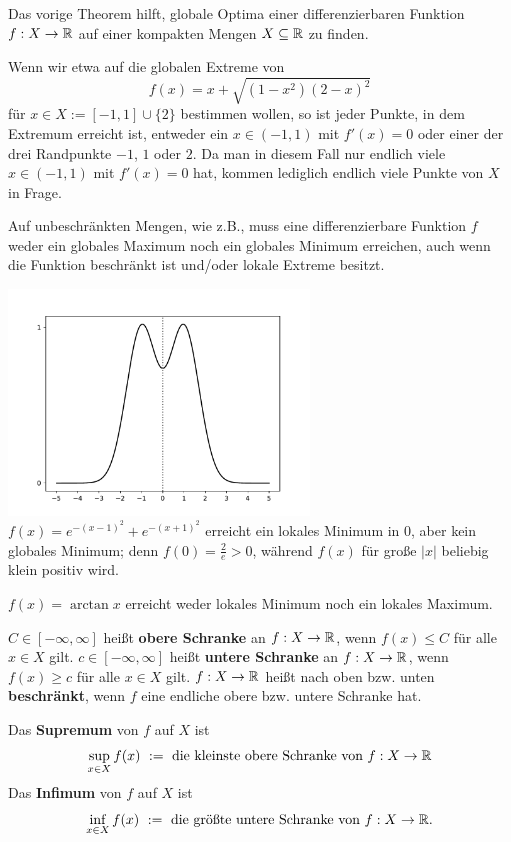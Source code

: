 \begin{bsp}
	Das vorige Theorem hilft, globale Optima einer differenzierbaren Funktion $ f: X \to \mathbb{R}$ auf einer kompakten Mengen $X \subseteq \mathbb{R}$ zu finden. 
	
	Wenn wir etwa auf die globalen Extreme von 
	\[
		f(x) = x +  \sqrt{(1-x^2) (2-x)^2 }  
	\]
	für $x \in X:= [-1,1] \cup \{2\}$ bestimmen wollen, so ist jeder Punkte, in dem Extremum erreicht ist, entweder ein $x \in (-1,1)$ mit $f'(x) = 0$ oder einer der drei Randpunkte $-1$, $1$ oder $2$. Da man in diesem Fall nur endlich viele $x \in (-1,1)$ mit $f'(x) = 0$ hat, kommen lediglich endlich viele Punkte von $X$ in Frage. 
\end{bsp} 

\begin{bsp} 
		Auf unbeschränkten Mengen, wie z.B., muss eine differenzierbare Funktion $f$  weder ein globales Maximum noch ein globales Minimum erreichen, auch wenn die Funktion beschränkt ist und/oder lokale Extreme besitzt. 
		\begin{center}
			\includegraphics[width=0.6\textwidth]{pics/camel.pdf}
			\\  $f(x) = e^{-(x-1)^2} + e^{-(x+1)^2}$ erreicht ein lokales Minimum in $0$, aber kein globales Minimum; denn $f(0) = \frac{2}{e} >0$, während $f(x)$ für große $|x|$ beliebig klein positiv wird. 
		\end{center}
	
\end{bsp} 

\begin{bsp} 
	$f(x) = \arctan x$ erreicht weder lokales Minimum noch ein lokales Maximum. 
\end{bsp} 

\begin{defn}
	$C \in [-\infty,\infty]$ heißt \textbf{obere Schranke} an $f : X \to \mathbb{R}$, wenn $f(x) \le C$ für alle $x \in X$ gilt. $c \in [-\infty,\infty]$ heißt \textbf{untere Schranke} an $f : X \to
 \mathbb{R}$, wenn $f(x) \ge c$ für alle $x \in X$ gilt.  $f : X \to \mathbb{R}$ heißt nach oben bzw. unten \textbf{beschränkt}, wenn $f$ eine endliche obere bzw. untere Schranke hat. 
 
	Das \textbf{Supremum} von $f$ auf $X$ ist 
	\[
		\sup_{x \in X} f(x) \ :=  \ \text{die kleinste obere Schranke von $f : X \to \mathbb{R}$}
	\]
	Das \textbf{Infimum} von $f$ auf $X$ ist 
	\[
		\inf_{x \in X} f(x)  \ :=  \ \text{die größte untere Schranke von $f : X \to \mathbb{R}$}.
	\]
\end{defn} 


